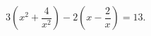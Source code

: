 \begin{ex}[type=equation]
	\begin{condition}
		 $3\left(x^2 +\dfrac{4}{x^2}\right) - 2 \left(x  - \dfrac{2}{x}\right) = 13.$
	\end{condition}
\end{ex}